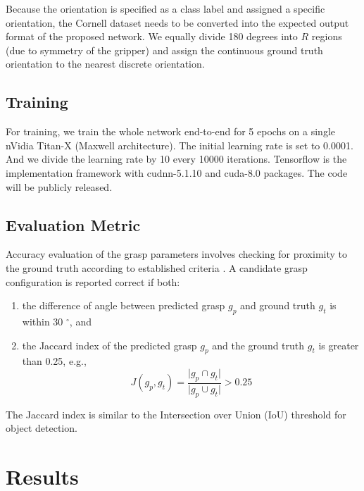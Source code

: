 \documentclass[letterpaper, 10 pt, journal, twoside]{IEEEtran}
\begin{document}
Because the orientation is specified as a class label and assigned a
specific orientation, the Cornell dataset needs to be converted into the
expected output format of the proposed network.  We equally divide 180
degrees into $R$ regions (due to symmetry of the gripper)
and assign the continuous ground truth orientation to the nearest discrete
orientation.

\subsection{Training}
For training, we train the whole network end-to-end for 5 epochs on a
single nVidia Titan-X (Maxwell architecture). The initial learning rate
is set to 0.0001. And we divide the learning rate by 10 every 10000
iterations. Tensorflow is the implementation framework with
cudnn-5.1.10 and cuda-8.0 packages.  The code will be publicly released.

\subsection{Evaluation Metric}
Accuracy evaluation of the grasp parameters involves checking for proximity
to the ground truth according to established criteria \cite{redmon2015real}. 
A candidate grasp configuration is reported correct if both:
\begin{enumerate}
  \item the difference of angle between predicted grasp $g_p$ and ground
    truth $g_t$ is within 30 $^\circ$, and
  \item the Jaccard index of the predicted grasp $g_p$ and the ground truth
    $g_t$ is greater than 0.25, e.g.,
    \begin{equation}
    \label{eqn_jaccard_index}
    J(g_p,g_t)=\frac{\vert g_p \cap g_t \vert}{\vert g_p \cup g_t \vert} >
    0.25 \tag{5}
    \end{equation}
\end{enumerate}
The Jaccard index is similar to the Intersection over Union (IoU) threshold
for object detection.  


\section{Results}
\end{document}
